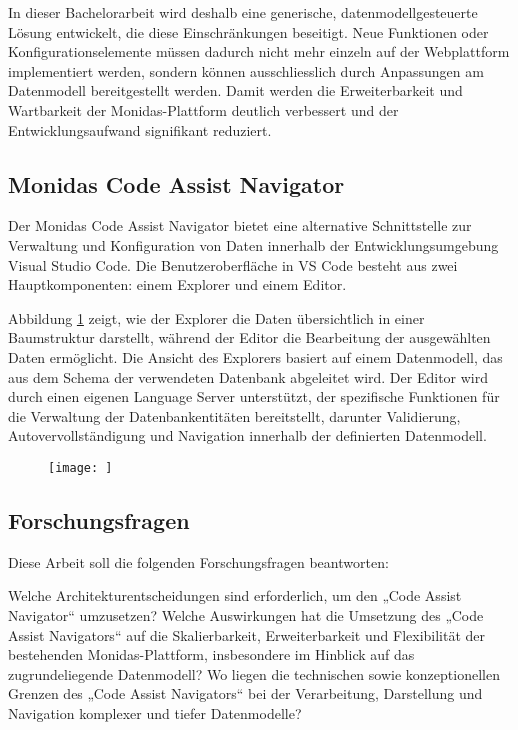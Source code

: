 In dieser Bachelorarbeit wird deshalb eine generische, datenmodellgesteuerte Lösung entwickelt, die diese Einschränkungen beseitigt. Neue Funktionen oder Konfigurationselemente müssen dadurch nicht mehr einzeln auf der Webplattform implementiert werden, sondern können ausschliesslich durch Anpassungen am Datenmodell bereitgestellt werden. Damit werden die Erweiterbarkeit und Wartbarkeit der Monidas-Plattform deutlich verbessert und der Entwicklungsaufwand signifikant reduziert.

\subsection{Monidas Code Assist Navigator}
Der Monidas Code Assist Navigator bietet eine alternative Schnittstelle zur Verwaltung und Konfiguration von Daten innerhalb der Entwicklungsumgebung Visual Studio Code. Die Benutzeroberfläche in VS Code besteht aus zwei Hauptkomponenten: einem Explorer und einem Editor.

Abbildung \ref{fig:res} zeigt, wie der Explorer die Daten übersichtlich in einer Baumstruktur darstellt, während der Editor die Bearbeitung der ausgewählten Daten ermöglicht. Die Ansicht des Explorers basiert auf einem Datenmodell, das aus dem Schema der verwendeten Datenbank abgeleitet wird. Der Editor wird durch einen eigenen Language Server unterstützt, der spezifische Funktionen für die Verwaltung der Datenbankentitäten bereitstellt, darunter Validierung, Autovervollständigung und Navigation innerhalb der definierten Datenmodell.



\begin{figure}[H]
  \centering
  \texttt{[image: ]}
  \caption{}
  \label{fig:res}
\end{figure}

\newpage

\subsection{Forschungsfragen}

Diese Arbeit soll die folgenden Forschungsfragen beantworten:

Welche Architekturentscheidungen sind erforderlich, um den „Code Assist Navigator“ umzusetzen? Welche Auswirkungen hat die Umsetzung des „Code Assist Navigators“ auf die Skalierbarkeit, Erweiterbarkeit und Flexibilität der bestehenden Monidas-Plattform, insbesondere im Hinblick auf das zugrundeliegende Datenmodell? Wo liegen die technischen sowie konzeptionellen Grenzen des „Code Assist Navigators“ bei der Verarbeitung, Darstellung und Navigation komplexer und tiefer Datenmodelle?

